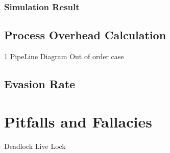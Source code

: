 \subsubsection{Simulation Result}
\subsection{Process Overhead Calculation}
1 PipeLine Diagram
Out of order case
\subsection{Evasion Rate}

\section{Pitfalls and Fallacies}
Deadlock Live Lock

